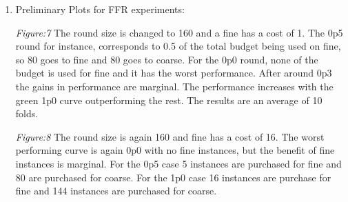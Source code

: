 \documentclass[11pt]{article}   	%
\begin{document}
\begin{enumerate}[ label=\textbf{\Roman*.},listparindent=1.5em]
\item Preliminary Plots for FFR experiments:\\%
\begin{center}	
\par \textit{Figure:7}   The round size is changed to 160 and a fine has a cost of 1.
The 0p5 round for instance, corresponds to 0.5 of the total budget being used on fine,
so 80 goes to fine and 80 goes to coarse. For the 0p0 round, none of the budget is
used for fine and it has the worst performance. After around 0p3 the gains in performance
are marginal. The performance increases with the green 1p0 curve outperforming the
rest. The results are an average of 10 folds.\\
\par \textit{Figure:8} The round size is again 160 and fine has a cost of 16.
The worst performing curve is again 0p0 with no fine instances, but the benefit of
fine instances is marginal. For the 0p5 case 5 instances are purchased for fine and
80 are purchased for coarse. For the 1p0 case 16 instances are purchase for fine and
144 instances are purchased for coarse.\\
\end{center}






\end{enumerate} %
\end{document}
